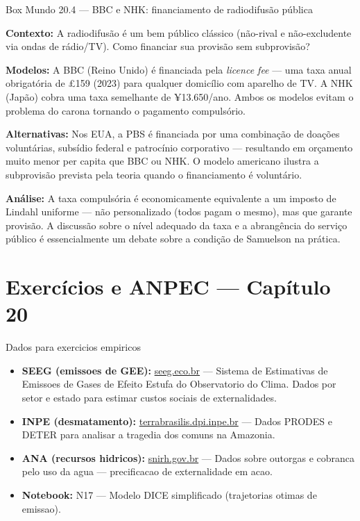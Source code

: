 \documentclass[11pt,twoside,openright]{book}
\providecommand{\tightlist}{\setlength{\itemsep}{0pt}\setlength{\parskip}{0pt}}
\begin{document}
\begin{boxmundobox}{Box Mundo 20.4 — BBC e NHK: financiamento de radiodifusão pública}

\textbf{Contexto:} A radiodifusão é um bem público clássico (não-rival e
não-excludente via ondas de rádio/TV). Como financiar sua provisão sem
subprovisão?

\textbf{Modelos:} A BBC (Reino Unido) é financiada pela \emph{licence
fee} --- uma taxa anual obrigatória de £159 (2023) para qualquer
domicílio com aparelho de TV. A NHK (Japão) cobra uma taxa semelhante de
¥13.650/ano. Ambos os modelos evitam o problema do carona tornando o
pagamento compulsório.

\textbf{Alternativas:} Nos EUA, a PBS é financiada por uma combinação de
doações voluntárias, subsídio federal e patrocínio corporativo ---
resultando em orçamento muito menor per capita que BBC ou NHK. O modelo
americano ilustra a subprovisão prevista pela teoria quando o
financiamento é voluntário.

\textbf{Análise:} A taxa compulsória é economicamente equivalente a um
imposto de Lindahl uniforme --- não personalizado (todos pagam o mesmo),
mas que garante provisão. A discussão sobre o nível adequado da taxa e a
abrangência do serviço público é essencialmente um debate sobre a
condição de Samuelson na prática.

\end{boxmundobox}

\chapter{Exercícios e ANPEC --- Capítulo
20}\label{exercuxedcios-e-anpec-capuxedtulo-20}

\begin{tipbox}{Dados para exercicios empiricos}

\begin{itemize}
\tightlist
\item
  \textbf{SEEG (emissoes de GEE):}
  \href{https://seeg.eco.br/}{seeg.eco.br} --- Sistema de Estimativas de
  Emissoes de Gases de Efeito Estufa do Observatorio do Clima. Dados por
  setor e estado para estimar custos sociais de externalidades.
\item
  \textbf{INPE (desmatamento):}
  \href{http://terrabrasilis.dpi.inpe.br/}{terrabrasilis.dpi.inpe.br}
  --- Dados PRODES e DETER para analisar a tragedia dos comuns na
  Amazonia.
\item
  \textbf{ANA (recursos hidricos):}
  \href{https://www.snirh.gov.br/}{snirh.gov.br} --- Dados sobre
  outorgas e cobranca pelo uso da agua --- precificacao de externalidade
  em acao.
\item
  \textbf{Notebook:} N17 --- Modelo DICE simplificado (trajetorias
  otimas de emissao).
\end{itemize}

\end{tipbox}
\end{document}
